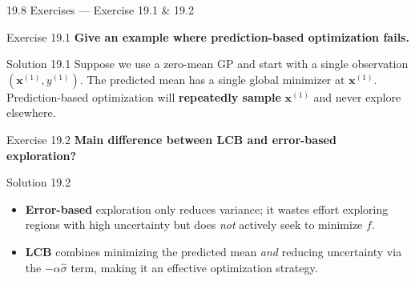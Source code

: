 \documentclass[aspectratio=169,10pt]{beamer}
\begin{document}
\begin{frame}{19.8 Exercises — Exercise 19.1 \& 19.2}
  \begin{block}{Exercise 19.1}
    \textbf{Give an example where prediction-based optimization fails.}
  \end{block}
  \begin{exampleblock}{Solution 19.1}
    Suppose we use a zero-mean GP and start with a single observation
    $(\mathbf{x}^{(1)}, y^{(1)})$.  The predicted mean has a single global
    minimizer at $\mathbf{x}^{(1)}$.  Prediction-based optimization will
    \textbf{repeatedly sample} $\mathbf{x}^{(1)}$ and never explore elsewhere.
  \end{exampleblock}

  \vspace{0.5em}

  \begin{block}{Exercise 19.2}
    \textbf{Main difference between LCB and error-based exploration?}
  \end{block}
  \begin{exampleblock}{Solution 19.2}
    \begin{itemize}
      \item \textbf{Error-based} exploration only reduces variance;
            it wastes effort exploring regions with high uncertainty
            but does \emph{not} actively seek to minimize $f$.
      \item \textbf{LCB} combines minimizing the predicted mean
            \emph{and} reducing uncertainty via the $-\alpha\hat{\sigma}$ term,
            making it an effective optimization strategy.
    \end{itemize}
  \end{exampleblock}
\end{frame}
\end{document}
